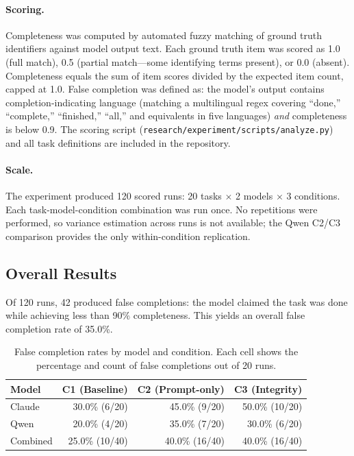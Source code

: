 \paragraph{Scoring.}
Completeness was computed by automated fuzzy matching of ground truth identifiers against model output text.
Each ground truth item was scored as 1.0 (full match), 0.5 (partial match---some identifying terms present), or 0.0 (absent).
Completeness equals the sum of item scores divided by the expected item count, capped at 1.0.
False completion was defined as: the model's output contains completion-indicating language (matching a multilingual regex covering ``done,'' ``complete,'' ``finished,'' ``all,'' and equivalents in five languages) \emph{and} completeness is below 0.9.
The scoring script (\texttt{research/experiment/scripts/analyze.py}) and all task definitions are included in the repository.

\paragraph{Scale.}
The experiment produced 120 scored runs: 20 tasks $\times$ 2 models $\times$ 3 conditions.
Each task-model-condition combination was run once.
No repetitions were performed, so variance estimation across runs is not available; the Qwen C2/C3 comparison provides the only within-condition replication.


\subsection{Overall Results}
\label{sec:exp-results}

Of 120 runs, 42 produced false completions: the model claimed the task was done while achieving less than 90\% completeness.
This yields an overall false completion rate of 35.0\%.

\begin{table}[htbp]
\centering
\caption{False completion rates by model and condition. Each cell shows the percentage and count of false completions out of 20 runs.}
\label{tab:fc-rates}
\begin{tabular}{lrrr}
\toprule
Model & C1 (Baseline) & C2 (Prompt-only) & C3 (Integrity) \\
\midrule
Claude & 30.0\% (6/20) & 45.0\% (9/20) & 50.0\% (10/20) \\
Qwen & 20.0\% (4/20) & 35.0\% (7/20) & 30.0\% (6/20) \\
\midrule
Combined & 25.0\% (10/40) & 40.0\% (16/40) & 40.0\% (16/40) \\
\bottomrule
\end{tabular}
\end{table}

